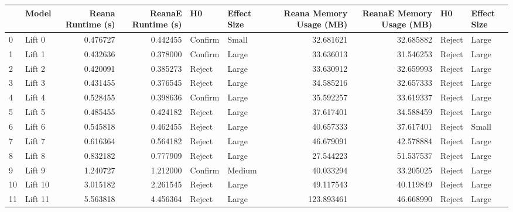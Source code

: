 \begin{tabular}{llrrllrrll}
\toprule
{} &    Model &  Reana Runtime (s) &  ReanaE Runtime (s) &       H0 & Effect Size &  Reana Memory Usage (MB) &  ReanaE Memory Usage (MB) &       H0 & Effect Size \\
\midrule
0  &   Lift 0 &           0.476727 &            0.442455 &  Confirm &       Small &                32.681621 &                 32.685882 &   Reject &       Large \\
1  &   Lift 1 &           0.432636 &            0.378000 &  Confirm &       Large &                33.636013 &                 31.546253 &   Reject &       Large \\
2  &   Lift 2 &           0.420091 &            0.385273 &   Reject &       Large &                33.630912 &                 32.659993 &   Reject &       Large \\
3  &   Lift 3 &           0.431455 &            0.376545 &   Reject &       Large &                34.585216 &                 32.657333 &   Reject &       Large \\
4  &   Lift 4 &           0.528455 &            0.398636 &  Confirm &       Large &                35.592257 &                 33.619337 &   Reject &       Large \\
5  &   Lift 5 &           0.485455 &            0.424182 &   Reject &       Large &                37.617401 &                 34.588459 &   Reject &       Large \\
6  &   Lift 6 &           0.545818 &            0.462455 &   Reject &       Large &                40.657333 &                 37.617401 &   Reject &       Small \\
7  &   Lift 7 &           0.616364 &            0.564182 &   Reject &       Large &                46.679091 &                 42.578884 &   Reject &       Large \\
8  &   Lift 8 &           0.832182 &            0.777909 &   Reject &       Large &                27.544223 &                 51.537537 &   Reject &       Large \\
9  &   Lift 9 &           1.240727 &            1.212000 &  Confirm &      Medium &                40.033294 &                 33.205025 &   Reject &       Large \\
10 &  Lift 10 &           3.015182 &            2.261545 &   Reject &       Large &                49.117543 &                 40.119849 &   Reject &       Large \\
11 &  Lift 11 &           5.563818 &            4.456364 &   Reject &       Large &               123.893461 &                 46.668990 &   Reject &       Large \\

\end{tabular}
